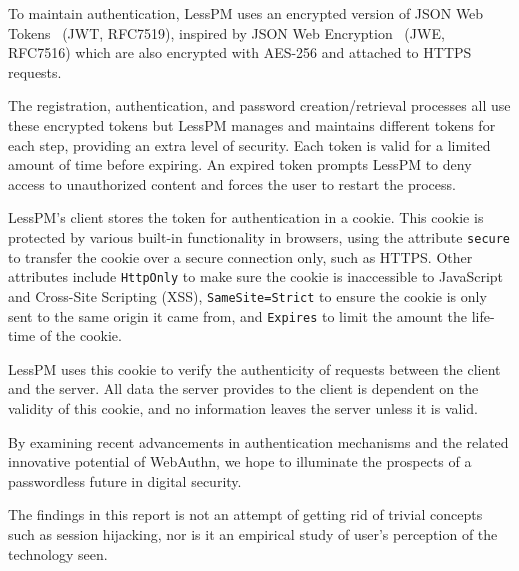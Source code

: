 To maintain authentication, LessPM uses an encrypted version of JSON Web
Tokens~\cite{RFC7519} (JWT, RFC7519), inspired by JSON Web
Encryption~\cite{rfc7516} (JWE, RFC7516) which are also encrypted with AES-256
and attached to HTTPS requests.

The registration, authentication, and password creation/retrieval processes
all use these encrypted tokens but LessPM manages and maintains different
tokens for each step, providing an extra level of security.
Each token is valid for a limited amount of time before expiring.
An expired token prompts LessPM to deny access to unauthorized content and
forces the user to restart the process.

LessPM's client stores the token for authentication in a cookie.
This cookie is protected by various built-in functionality in browsers, using
the attribute \texttt{secure} to transfer the cookie over a secure connection
only, such as HTTPS\@.
Other attributes include \texttt{HttpOnly} to make sure the cookie is
inaccessible to JavaScript and Cross-Site Scripting (XSS),
\texttt{SameSite=Strict} to ensure the cookie is only sent to the same origin
it came from, and \texttt{Expires} to limit the amount the life-time of the
cookie.

LessPM uses this cookie to verify the authenticity of requests between the
client and the server.
All data the server provides to the client is dependent on the validity of
this cookie, and no information leaves the server unless it is valid.

By examining recent advancements in authentication mechanisms and the related
innovative potential of WebAuthn, we hope to illuminate the prospects of a
passwordless future in digital security.

The findings in this report is not an attempt of getting rid of trivial
concepts such as session hijacking, nor is it an empirical study of user's
perception of the technology seen.
